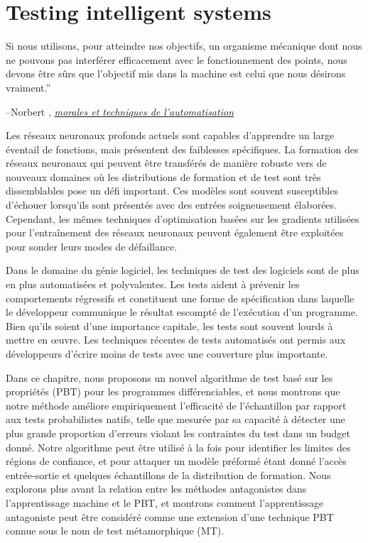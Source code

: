 \chapter{Testing intelligent systems}\label{ch:difftest}

\setlength{\epigraphwidth}{0.80\textwidth}
\epigraph{Si nous utilisons, pour atteindre nos objectifs, un organisme mécanique dont nous ne pouvons pas interférer efficacement avec le fonctionnement des points, nous devons être sûrs que l'objectif mis dans la machine est celui que nous désirons vraiment.''}{\begin{flushright}--Norbert \citet{wiener1960some}, \href{https://www.ias.ac.in/article/fulltext/reso/004/01/0080-0088}{\textit{ morales et techniques de l'automatisation}}~\end{flushright}}

Les réseaux neuronaux profonds actuels sont capables d'apprendre un large éventail de fonctions, mais présentent des faiblesses spécifiques. La formation des réseaux neuronaux qui peuvent être transférés de manière robuste vers de nouveaux domaines où les distributions de formation et de test sont très dissemblables pose un défi important. Ces modèles sont souvent susceptibles d'échouer lorsqu'ils sont présentés avec des entrées soigneusement élaborées. Cependant, les mêmes techniques d'optimisation basées sur les gradients utilisées pour l'entraînement des réseaux neuronaux peuvent également être exploitées pour sonder leurs modes de défaillance.

Dans le domaine du génie logiciel, les techniques de test des logiciels sont de plus en plus automatisées et polyvalentes. Les tests aident à prévenir les comportements régressifs et constituent une forme de spécification dans laquelle le développeur communique le résultat escompté de l'exécution d'un programme. Bien qu'ils soient d'une importance capitale, les tests sont souvent lourds à mettre en œuvre. Les techniques récentes de tests automatisés ont permis aux développeurs d'écrire moins de tests avec une couverture plus importante.

Dans ce chapitre, nous proposons un nouvel algorithme de test basé sur les propriétés (PBT) pour les programmes différenciables, et nous montrons que notre méthode améliore empiriquement l'efficacité de l'échantillon par rapport aux tests probabilistes natifs, telle que mesurée par sa capacité à détecter une plus grande proportion d'erreurs violant les contraintes du test dans un budget donné. Notre algorithme peut être utilisé à la fois pour identifier les limites des régions de confiance, et pour attaquer un modèle préformé étant donné l'accès entrée-sortie et quelques échantillons de la distribution de formation. Nous explorons plus avant la relation entre les méthodes antagonistes dans l'apprentissage machine et le PBT, et montrons comment l'apprentissage antagoniste peut être considéré comme une extension d'une technique PBT connue sous le nom de test métamorphique (MT).

